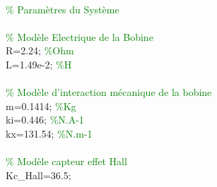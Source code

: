 \hspace{1mm} \\ 
\hspace{1mm}\textcolor{green}{\% Paramètres du Système }\\ 
\hspace{1mm} \\ 
\hspace{1mm}\textcolor{green}{\% Modèle Electrique de la Bobine }\\ 
\hspace{1mm}R=2.24; \textcolor{green}{\%Ohm }\\ 
\hspace{1mm}L=1.49e-2; \textcolor{green}{\%H }\\ 
\hspace{1mm} \\ 
\hspace{1mm}\textcolor{green}{\% Modèle d'interaction mécanique de la bobine }\\ 
\hspace{1mm}m=0.1414; \textcolor{green}{\%Kg }\\ 
\hspace{1mm}ki=0.446; \textcolor{green}{\%N.A-1 }\\ 
\hspace{1mm}kx=131.54; \textcolor{green}{\%N.m-1 }\\ 
\hspace{1mm} \\ 
\hspace{1mm}\textcolor{green}{\% Modèle capteur effet Hall }\\ 
\hspace{1mm}Kc\_Hall=36.5;  \\ 
\hspace{1mm} \\ 
